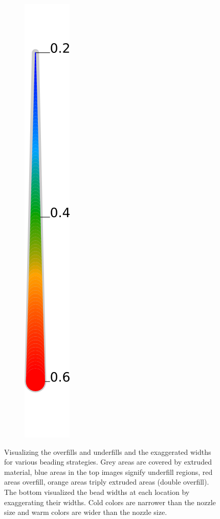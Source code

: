 \begin{figure}
\begin{subfigure}{.04\columnwidth}
\includegraphics[height=\figheight]{sources/validation/gMAT_example/widths_legend.png}
\end{subfigure}
\caption{
Visualizing the overfills and underfills and the exaggerated widths for various beading strategies.
Grey areas are covered by extruded material,
blue areas in the top images signify underfill regions,
red areas overfill,
orange areas triply extruded areas (double overfill).
The bottom visualized the bead widths at each location by exaggerating their widths.
Cold colors are narrower than the nozzle size and warm colors are wider than the nozzle size.
}
\label{visualized_accuracy}
\end{figure}








